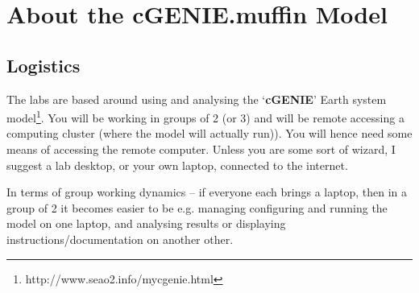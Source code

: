 \documentclass[11pt,fleqn]{book} %
\begin{document}


\pagestyle{empty} %

\tableofcontents %

\cleardoublepage %

\pagestyle{fancy} %


\cleardoublepage
\chapter*{About the cGENIE.muffin Model}

\hfill \break

\noindent 


\newpage


\section*{Logistics}

The labs are based around using and analysing the ‘\textbf{cGENIE}’ Earth system model\footnote{http://www.seao2.info/mycgenie.html}. You will be working in groups of 2 (or 3) and will be remote accessing a computing cluster (where the model will actually run)). You will hence need some means of accessing the remote computer. Unless you are some sort of wizard, I suggest a lab desktop, or your own laptop, connected to the internet.

In terms of group working dynamics -- if everyone each brings a laptop, then in a group of 2 it becomes easier to be e.g. managing configuring and running the model on one laptop, and analysing results or displaying instructions/documentation on another other.

\end{document}
